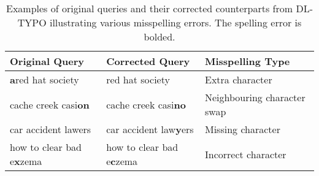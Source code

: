 \begin{table}[h]
\centering
\caption{Examples of original queries and their corrected counterparts from DL-TYPO illustrating various misspelling errors. The spelling error is bolded.}
\label{tab:dl-egs}
\begin{tabularx}{\columnwidth}{X|X|X}
\textbf{Original Query} & \textbf{Corrected Query} & \textbf{Misspelling Type} \\ \hline
\textbf{a}red hat society & red hat society & Extra character \\
cache creek casi\textbf{on} & cache creek casi\textbf{no} & Neighbouring character swap \\
car accident lawers & car accident law\textbf{y}ers & Missing character \\
how to clear bad e\textbf{x}zema & how to clear bad e\textbf{c}zema & Incorrect character \\ \hline
\end{tabularx}
\end{table}
